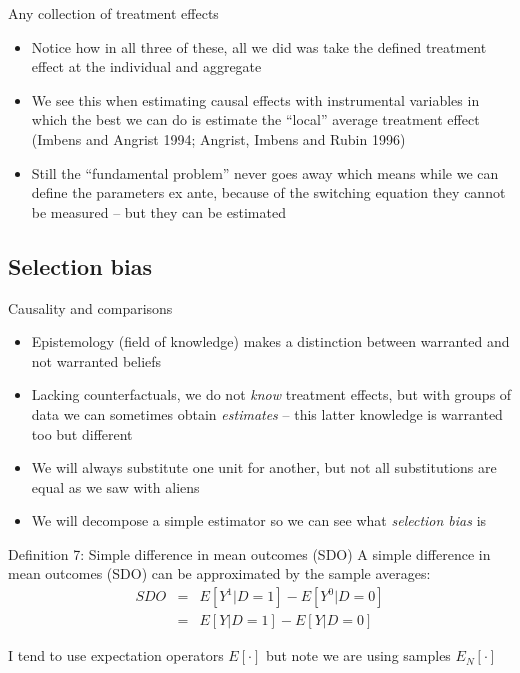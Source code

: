 \documentclass{beamer}
\begin{document}
\begin{frame}{Any collection of treatment effects}

  \begin{itemize}
    \item Notice how in all three of these, all we did was take the defined treatment effect at the individual and aggregate
    \item We see this when estimating causal effects with instrumental variables in which the best we can do is estimate the ``local'' average treatment effect (Imbens and Angrist 1994; Angrist, Imbens and Rubin 1996)
    \item Still the ``fundamental problem'' never goes away which means while we can define the parameters ex ante, because of the switching equation they cannot be measured -- but they can be estimated
  \end{itemize}

\end{frame}

\subsection{Selection bias}




\begin{frame}{Causality and comparisons}

  \begin{itemize}
    \item Epistemology (field of knowledge) makes a distinction between warranted and not warranted beliefs
    \item Lacking counterfactuals, we do not \emph{know} treatment effects, but with groups of data we can sometimes obtain \emph{estimates} -- this latter knowledge is warranted too but different
    \item We will always substitute one unit for another, but not all substitutions are equal as we saw with aliens
    \item We will decompose a simple estimator so we can see what \emph{selection bias} is
  \end{itemize}
\end{frame}



\begin{frame}[plain]


  \begin{block}{Definition 7: Simple difference in mean outcomes (SDO)}
    A simple difference in mean outcomes (SDO) can be approximated by the sample averages:\begin{eqnarray*}
      SDO &=& E[Y^1 | D=1] - E[Y^0 | D=0] \\
      &=& E[Y | D=1] - E[Y | D=0]
    \end{eqnarray*}
  \end{block}
  \bigskip
  I tend to use expectation operators $E[ \cdot ]$ but note we are using samples $E_N[ \cdot ]$

\end{frame}
\end{document}
